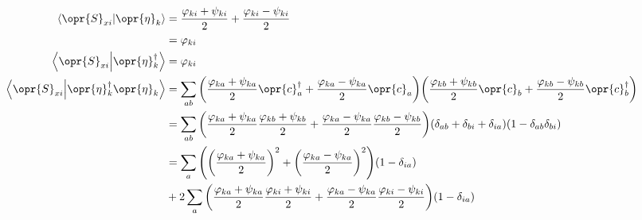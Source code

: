 \documentclass[../thesis.tex]{subfiles}
\begin{document}
\begin{align}
  \ip{\opr{S}_{xi}}{\opr{\eta}_k}
  &= \frac{\varphi_{ki} + \psi_{ki}}{2} + \frac{\varphi_{ki} - \psi_{ki}}{2} \\
  &= \varphi_{ki}
  \\
  \ip{\opr{S}_{xi}}{\opr{\eta}_k^\dag}
  &= \varphi_{ki}
  \\
  \ip{\opr{S}_{xi}}{\opr{\eta}_k^\dag\opr{\eta}_k}
  &=
  \sum_{ab}
  \qty(%
  \frac{\varphi_{ka} + \psi_{ka}}{2}
  \opr{c}_a^\dag
  +
  \frac{\varphi_{ka} - \psi_{ka}}{2}
  \opr{c}_a
  )
  \qty(%
  \frac{\varphi_{kb} + \psi_{kb}}{2}
  \opr{c}_b
  +
  \frac{\varphi_{kb} - \psi_{kb}}{2}
  \opr{c}_b^\dag
  ) \\
  &=
  \sum_{ab}
  \qty(%
  \frac{\varphi_{ka} + \psi_{ka}}{2}
  \frac{\varphi_{kb} + \psi_{kb}}{2}
  +
  \frac{\varphi_{ka} - \psi_{ka}}{2}
  \frac{\varphi_{kb} - \psi_{kb}}{2}
  )
  (\delta_{ab} + \delta_{bi} + \delta_{ia})(1 - \delta_{ab}\delta_{bi})
  \\
  &=
  \sum_a
  \qty(%
  {\qty(\frac{\varphi_{ka} + \psi_{ka}}{2})}^2
  +
  {\qty(\frac{\varphi_{ka} - \psi_{ka}}{2})}^2
  )(1 - \delta_{ia}) \\
  &+
  2\sum_a
  \qty(%
  \frac{\varphi_{ka} + \psi_{ka}}{2}
  \frac{\varphi_{ki} + \psi_{ki}}{2}
  +
  \frac{\varphi_{ka} - \psi_{ka}}{2}
  \frac{\varphi_{ki} - \psi_{ki}}{2}
  )
  (1 - \delta_{ia})
  \\
\end{align}
\end{document}
